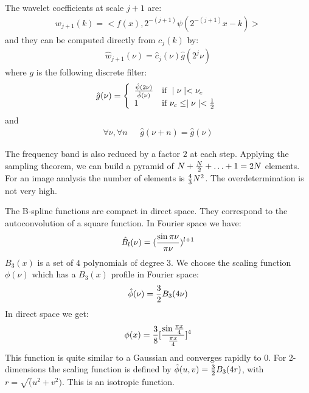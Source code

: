\documentclass[11pt,a4paper]{article}
\begin{document}
The wavelet coefficients at scale $j+1$ are:
\begin{eqnarray}
w_{j+1}(k)=<f(x),2^{-(j+1)}\psi(2^{-(j+1)}x-k)>
\end{eqnarray}
and they can be computed directly from $c_j(k)$ by:
\begin{eqnarray}
\hat{w}_{j+1}(\nu)=\hat{c}_{j}(\nu)\hat g(2^{j}\nu)
\end{eqnarray}
where $g$ is the following  discrete filter:
\begin{eqnarray}
\hat g(\nu)= \left\{
  \begin{array}{ll}
  {\hat{\psi}(2\nu)\over \hat{\phi}(\nu)} & \mbox{if } \mid \nu \mid < \nu_c \\
1 & \mbox{if } \nu_c  \leq \mid \nu \mid < {1\over 2} 
  \end{array}
  \right.
\end{eqnarray}
and
\begin{eqnarray}
\forall \nu, \forall n \mbox{    } & \hat g(\nu + n) = \hat g(\nu)
\end{eqnarray}

The frequency band is also reduced by a factor $2$ at each step.
Applying the sampling theorem, we can build a pyramid  of
 $N+{N\over 2}+\ldots+1=2N$ elements.
For an image analysis the number of elements is ${4\over 3}N^2$. The
overdetermination is not very high.

The B-spline functions are compact in direct space. They
correspond to the autoconvolution of a square function. In
Fourier space we have:
\begin{eqnarray}
\hat B_l(\nu)=({\sin\pi\nu\over\pi\nu})^{l+1}
\end{eqnarray}
$B_3(x)$ is a set of $4$ polynomials of degree $3$.
We choose the scaling function $\phi(\nu)$ which has a
$B_3(x)$ profile in Fourier space:
\begin{eqnarray}
\hat{\phi}(\nu)={3\over 2}B_3(4\nu)
\end{eqnarray}
In direct space we get:
\begin{eqnarray}
\phi(x)={3\over 8}[{\sin{\pi x\over 4}\over {\pi x\over
4}}]^4
\end{eqnarray}
This function is quite similar to a Gaussian and converges
rapidly to $0$. For 2-dimensions the scaling function is defined by
$\hat \phi(u,v) = {3\over 2}B_3(4r)$, with $r = \sqrt(u^2+v^2)$.
This is an isotropic function.
\end{document}
